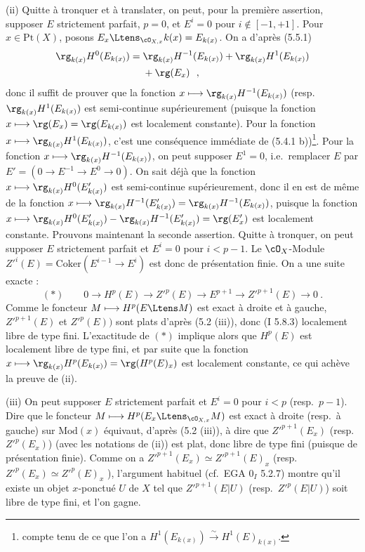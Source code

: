 \smallskip

(ii) Quitte \`{a} tronquer et \`{a} translater, on peut, pour la premi\`{e}re assertion, supposer $E$ strictement parfait, $p = 0$, et $E^i = 0$ pour $i \notin [-1,+1]$. Pour $x \in \mathrm{Pt}(X)$, posons $E_x \Ltens_{\cO_{X,x}} k(x) = E_{k(x)}$. On a d'apr\`{e}s (5.5.1)
\begin{align*}
\rg_{k(x)} H^0(E_{k(x)}) ={} & \rg_{k(x)} H^{-1}(E_{k(x)}) + \rg_{k(x)} H^1(E_{k(x)}) \\
& + \rg(E_x)\ \ ,
\end{align*}
donc il suffit de prouver que la fonction $x \longmapsto \rg_{k(x)} H^{-1}(E_{k(x)})$ (resp.\ $\rg_{k(x)} H^1(E_{k(x)})$ est semi-continue sup\'{e}rieurement (puisque la fonction $x \longmapsto \rg(E_x) = \rg(E_{k(x)})$ est localement constante). Pour la fonction $x \longmapsto \rg_{k(x)} H^1(E_{k(x)})$, c'est une cons\'{e}quence imm\'{e}diate de (5.4.1 b))\footnote{compte tenu de ce que l'on a $H^1(E_{k(x)}) \xrightarrow{\sim} H^1(E)_{k(x)}$.}. Pour la fonction $x \longmapsto \rg_{k(x)} H^{-1}(E_{k(x)})$, on peut supposer $E^1 = 0$, i.e.\ remplacer $E$ par $E' = (0 \longrightarrow E^{-1} \longrightarrow E^0 \longrightarrow 0)$. On sait d\'{e}j\`{a} que la fonction $x \longmapsto \rg_{k(x)} H^0(E'_{k(x)})$ est semi-continue sup\'{e}rieurement, donc il en est de m\^{e}me de la fonction $x \longmapsto \rg_{k(x)} H^{-1}(E'_{k(x)}) = \rg_{k(x)} H^{-1}(E_{k(x)})$, puisque la fonction $x \longmapsto \rg_{k(x)} H^0(E'_{k(x)}) - \rg_{k(x)} H^{-1}(E'_{k(x)}) = \rg(E'_x)$ est localement constante. Prouvons maintenant la seconde assertion. Quitte \`{a} tronquer, on peut supposer $E$ strictement parfait et $E^i = 0$ pour $i < p-1$. Le $\cO_X$-Module $Z'^i(E) = \mathrm{Coker}(E^{i-1} \longrightarrow E^i)$ est donc de pr\'{e}sentation finie. On a une suite exacte :
\[
(*) \qquad 0 \longrightarrow H^p(E) \longrightarrow Z'^p(E) \longrightarrow E^{p+1} \longrightarrow Z'^{p+1}(E) \longrightarrow 0\ .
\]
Comme le foncteur $M \longmapsto H^p(E \Ltens M)$ est exact \`{a} droite et \`{a} gauche, $Z'^{p+1}(E)$ et $Z'^p(E))$ sont plats d'apr\`{e}s (5.2 (iii)), donc (I 5.8.3) localement libre de type fini. L'exactitude de $(*)$ implique alors que $H^p(E)$ est localement libre de type fini, et par suite que la fonction $x \longmapsto \rg_{k(x)} H^p(E_{k(x)}) = \rg(H^p(E)_x)$ est localement constante, ce qui ach\`{e}ve la preuve de (ii).

\smallskip

(iii) On peut supposer $E$ strictement parfait et $E^i = 0$ pour $i < p$ (resp.\ $p-1$). Dire que le foncteur $M \longmapsto H^p(E_x \Ltens_{\cO_{X,x}} M)$ est exact \`{a} droite (resp.\ \`{a} gauche) sur $\mathrm{Mod}(x)$ \'{e}quivaut, d'apr\`{e}s (5.2 (iii)), \`{a} dire que $Z'^{p+1}(E_x)$ (resp.\ $Z'^p(E_x)$) (avec les notations de (ii)) est plat, donc libre de type fini (puisque de pr\'{e}sentation finie). Comme on a $Z'^{p+1}(E_x) \simeq Z'^{p+1}(E)_x$ (resp.\ $Z'^p(E_x) \simeq Z'^p(E)_x$ ), l'argument habituel (cf.\ EGA $0_I$ 5.2.7) montre qu'il existe un objet $x$-ponctu\'{e} $U$ de $X$ tel que $Z'^{p+1}(E|U)$ (resp.\ $Z'^p(E|U)$) soit libre de type fini, et l'on gagne.

